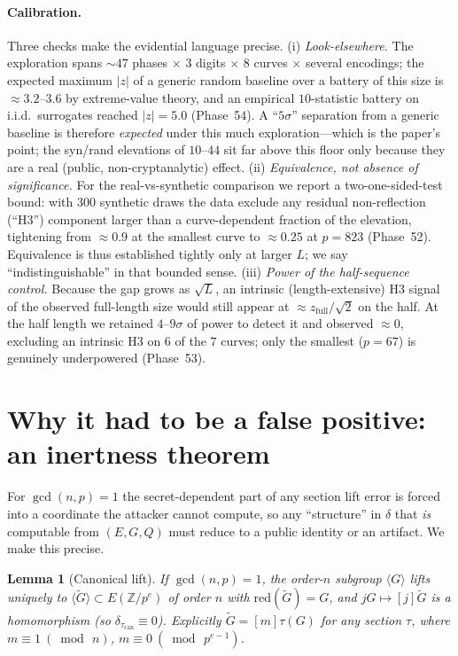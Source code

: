 \documentclass[11pt]{article}
\newtheorem{lemma}{Lemma}
\theoremstyle{definition}
\newcommand{\Z}{\mathbb{Z}}
\newcommand{\red}{\mathrm{red}}
\begin{document}
\paragraph{Calibration.} Three checks make the evidential language
precise. (i) \emph{Look-elsewhere.} The exploration spans $\sim$$47$
phases $\times$ $3$ digits $\times$ $8$ curves $\times$ several encodings;
the expected maximum $|z|$ of a generic random baseline over a battery of
this size is $\approx3.2$--$3.6$ by extreme-value theory, and an empirical
$10$-statistic battery on i.i.d.\ surrogates reached $|z|=5.0$ (Phase~54).
A ``$5\sigma$'' separation from a generic baseline is therefore
\emph{expected} under this much exploration---which is the paper's point;
the syn/rand elevations of $10$--$44$ sit far above this floor only because
they are a real (public, non-cryptanalytic) effect. (ii)
\emph{Equivalence, not absence of significance.} For the real-vs-synthetic
comparison we report a two-one-sided-test bound: with $300$ synthetic
draws the data exclude any residual non-reflection (``H3'') component
larger than a curve-dependent fraction of the elevation, tightening from
$\approx0.9$ at the smallest curve to $\approx0.25$ at $p=823$ (Phase~52).
Equivalence is thus established tightly only at larger $L$; we say
``indistinguishable'' in that bounded sense. (iii) \emph{Power of the
half-sequence control.} Because the gap grows as $\sqrt L$, an intrinsic
(length-extensive) H3 signal of the observed full-length size would still
appear at $\approx z_{\mathrm{full}}/\sqrt2$ on the half. At the half
length we retained $4$--$9\sigma$ of power to detect it and observed
$\approx0$, excluding an intrinsic H3 on $6$ of the $7$ curves; only the
smallest ($p=67$) is genuinely underpowered (Phase~53).

\section{Why it had to be a false positive: an inertness theorem}
\label{sec:theorem}

For $\gcd(n,p)=1$ the secret-dependent part of any section lift error is
forced into a coordinate the attacker cannot compute, so any
``structure'' in $\delta$ that \emph{is} computable from $(E,G,Q)$ must
reduce to a public identity or an artifact. We make this precise.

\begin{lemma}[Canonical lift]\label{lem:can}
If $\gcd(n,p)=1$, the order-$n$ subgroup $\langle G\rangle$ lifts
uniquely to $\langle\widetilde G\rangle\subset E(\Z/p^e)$ of order $n$
with $\red(\widetilde G)=G$, and $jG\mapsto[j]\widetilde G$ is a
homomorphism (so $\delta_{\tau_{\mathrm{can}}}\equiv 0$). Explicitly
$\widetilde G=[m]\tau(G)$ for any section $\tau$, where
$m\equiv 1\ (\bmod\,n)$, $m\equiv 0\ (\bmod\,p^{e-1})$.
\end{lemma}
\end{document}
